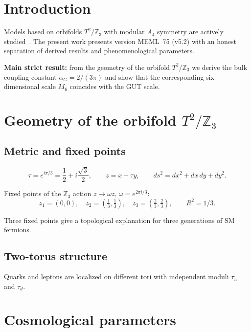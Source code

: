\documentclass[12pt,a4paper]{article}
\numberwithin{equation}{section}
\begin{document}
\tableofcontents

\section{Introduction}

Models based on orbifolds $T^2/\mathbb{Z}_3$ with modular
$A_4$ symmetry are actively studied~\cite{Feruglio2017,Kobayashi2019}.
The present work presents version MEML~75 (v5.2) with an honest
separation of derived results and phenomenological parameters.

\textbf{Main strict result:} from the geometry of the orbifold
$T^2/\mathbb{Z}_3$ we derive the bulk coupling constant
$\alpha_G = 2/(3\pi)$ and show that the corresponding
six-dimensional scale $M_6$ coincides with the GUT scale.

\section{Geometry of the orbifold $T^2/\mathbb{Z}_3$}

\subsection{Metric and fixed points}

\begin{equation}
\tau = e^{i\pi/3} = \frac{1}{2} + i\frac{\sqrt3}{2}, \qquad
z = x + \tau y, \qquad ds^2 = dx^2 + dx\,dy + dy^2.
\end{equation}

Fixed points of the $\mathbb{Z}_3$ action $z \to \omega z$,
$\omega = e^{2\pi i/3}$:
\begin{equation}
z_1 = (0,0), \quad z_2 = \left(\tfrac13,\tfrac13\right), \quad
z_3 = \left(\tfrac23,\tfrac23\right), \qquad R^2 = 1/3.
\end{equation}

Three fixed points give a topological explanation for three
generations of SM fermions.

\subsection{Two-torus structure}

Quarks and leptons are localized on different tori with
independent moduli $\tau_u$ and $\tau_d$.

\section{Cosmological parameters}
\end{document}
